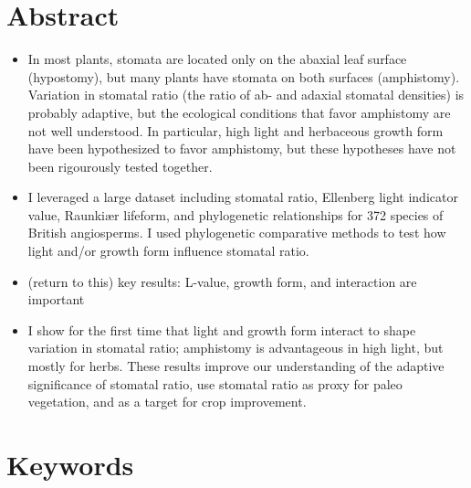 \documentclass[12pt, oneside]{article}
\newcommand{\stretchy}{2}
\newcommand{\el}{L-value}
\begin{document}

\linenumbers
\setstretch{\stretchy}


\section*{Abstract}


\begin{itemize}
	\item In most plants, stomata are located only on the abaxial leaf surface (hypostomy), but many plants have stomata on both surfaces (amphistomy). Variation in stomatal ratio (the ratio of ab- and adaxial stomatal densities) is probably adaptive, but the ecological conditions that favor amphistomy are not well understood. In particular, high light and herbaceous growth form have been hypothesized to favor amphistomy, but these hypotheses have not been rigourously tested together.
	\item I leveraged a large dataset including stomatal ratio, Ellenberg light indicator value, Raunki\ae r lifeform, and phylogenetic relationships for 372 species of British angiosperms. I used phylogenetic comparative methods to test how light and/or growth form influence stomatal ratio.
	\item (return to this) key results: \el, growth form, and interaction are important
	\item I show for the first time that light and growth form interact to shape variation in stomatal ratio; amphistomy is advantageous in high light, but mostly for herbs. These results improve our understanding of the adaptive significance of stomatal ratio, use stomatal ratio as proxy for paleo vegetation, and as a target for crop improvement.
\end{itemize}


\section*{Keywords}
\end{document}
